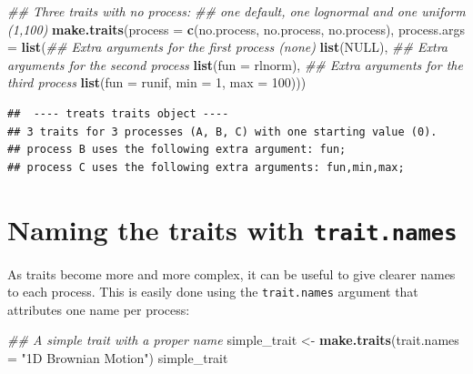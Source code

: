 \documentclass[
]{book}
\newenvironment{Shaded}{\begin{snugshade}}{\end{snugshade}}
\newcommand{\CommentTok}[1]{\textcolor[rgb]{0.56,0.35,0.01}{\textit{#1}}}
\newcommand{\DataTypeTok}[1]{\textcolor[rgb]{0.13,0.29,0.53}{#1}}
\newcommand{\DecValTok}[1]{\textcolor[rgb]{0.00,0.00,0.81}{#1}}
\newcommand{\KeywordTok}[1]{\textcolor[rgb]{0.13,0.29,0.53}{\textbf{#1}}}
\newcommand{\NormalTok}[1]{#1}
\newcommand{\OtherTok}[1]{\textcolor[rgb]{0.56,0.35,0.01}{#1}}
\newcommand{\StringTok}[1]{\textcolor[rgb]{0.31,0.60,0.02}{#1}}
\begin{document}
\begin{Shaded}
\begin{Highlighting}[]
\CommentTok{\#\# Three traits with no process:}
\CommentTok{\#\# one default, one lognormal and one uniform (1,100)}
\KeywordTok{make.traits}\NormalTok{(}\DataTypeTok{process      =} \KeywordTok{c}\NormalTok{(no.process, no.process, no.process),}
            \DataTypeTok{process.args =} \KeywordTok{list}\NormalTok{(}\CommentTok{\#\# Extra arguments for the first process (none)}
                                \KeywordTok{list}\NormalTok{(}\OtherTok{NULL}\NormalTok{),}
                                \CommentTok{\#\# Extra arguments for the second process}
                                \KeywordTok{list}\NormalTok{(}\DataTypeTok{fun =}\NormalTok{ rlnorm),}
                                \CommentTok{\#\# Extra arguments for the third process}
                                \KeywordTok{list}\NormalTok{(}\DataTypeTok{fun =}\NormalTok{ runif, }\DataTypeTok{min =} \DecValTok{1}\NormalTok{, }\DataTypeTok{max =} \DecValTok{100}\NormalTok{)))}
\end{Highlighting}
\end{Shaded}

\begin{verbatim}
##  ---- treats traits object ---- 
## 3 traits for 3 processes (A, B, C) with one starting value (0).
## process B uses the following extra argument: fun;
## process C uses the following extra arguments: fun,min,max;
\end{verbatim}

\hypertarget{naming-the-traits-with-trait.names}{%
\section{\texorpdfstring{Naming the traits with \texttt{trait.names}}{Naming the traits with trait.names}}\label{naming-the-traits-with-trait.names}}

As traits become more and more complex, it can be useful to give clearer names to each process.
This is easily done using the \texttt{trait.names} argument that attributes one name per process:

\begin{Shaded}
\begin{Highlighting}[]
\CommentTok{\#\# A simple trait with a proper name}
\NormalTok{simple\_trait \textless{}{-}}\StringTok{ }\KeywordTok{make.traits}\NormalTok{(}\DataTypeTok{trait.names =} \StringTok{"1D Brownian Motion"}\NormalTok{)}
\NormalTok{simple\_trait}
\end{Highlighting}
\end{Shaded}
\end{document}
